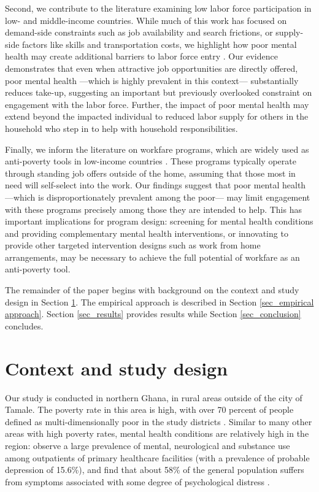 \documentclass[12pt, a4paper, american]{article}
\begin{document}
Second, we contribute to the literature examining low labor force participation in low- and middle-income countries. While much of this work has focused on demand-side constraints such as job availability and search frictions, or supply-side factors like skills and transportation costs, we highlight how poor mental health may create additional barriers to labor force entry \citep{rossi_relative_2022, collier_cost_2016,goldberg_demand-side_2020, carranza_job_2024}. Our evidence demonstrates that even when attractive job opportunities are directly offered, poor mental health ---which is highly prevalent in this context--- substantially reduces take-up, suggesting an important but previously overlooked constraint on engagement with the labor force. Further, the impact of poor mental health may extend beyond the impacted individual to reduced labor supply for others in the household who step in to help with household responsibilities. 

Finally, we inform the literature on workfare programs, which are widely used as anti-poverty tools in low-income countries \citep{besley_workfare_1992, bertrand_workfare_2021, murgai_is_2016,imbert_labor_2015}. These programs typically operate through standing job offers outside of the home, assuming that those most in need will self-select into the work. Our findings suggest that poor mental health ---which is disproportionately prevalent among the poor--- may limit engagement with these programs precisely among those they are intended to help. This has important implications for program design: screening for mental health conditions and providing complementary mental health interventions, or innovating to provide other targeted intervention designs such as work from home arrangements, may be necessary to achieve the full potential of workfare as an anti-poverty tool.

The remainder of the paper begins with background on the context and study design in Section \ref{sec_context_design}. The empirical approach is described in Section  \ref{sec_empirical approach}. Section \ref{sec_results} provides results while Section \ref{sec_conclusion} concludes. 


\section{Context and study design}\label{sec_context_design}
Our study is conducted in northern Ghana, in rural areas outside of the city of Tamale. The poverty rate in this area is high, with over 70 percent of people  defined as multi-dimensionally poor in the study districts \citep{ghana_statistical_service_multidimensional_2023}. Similar to many other areas with high poverty rates, mental health conditions are relatively high in the region: \citet{ae-ngibise_prevalence_2023} observe a large prevalence of mental, neurological and substance use among outpatients of primary healthcare facilities (with a prevalence of probable depression of 15.6\%), and \citet{barker_cognitive_2022} find that about 58\% of the general population suffers from symptoms associated with some degree of psychological distress \citep[compared to about 13 percent in the United States according to][]{Dhingra_2011}. \\
\end{document}

